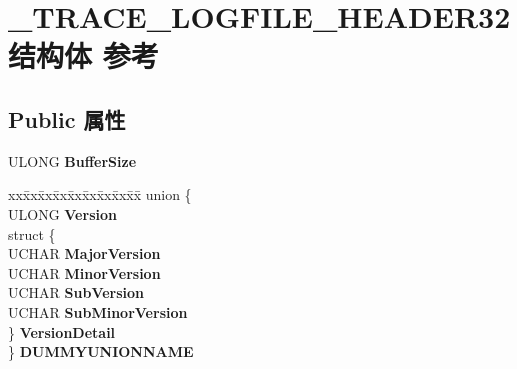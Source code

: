 \hypertarget{struct___t_r_a_c_e___l_o_g_f_i_l_e___h_e_a_d_e_r32}{}\section{\+\_\+\+T\+R\+A\+C\+E\+\_\+\+L\+O\+G\+F\+I\+L\+E\+\_\+\+H\+E\+A\+D\+E\+R32结构体 参考}
\label{struct___t_r_a_c_e___l_o_g_f_i_l_e___h_e_a_d_e_r32}
\subsection*{Public 属性}
\begin{DoxyCompactItemize}
\item 
\mbox{\label{struct___t_r_a_c_e___l_o_g_f_i_l_e___h_e_a_d_e_r32_a2806f760ee268343e968a0c167bb4b63}} 
U\+L\+O\+NG {\bfseries Buffer\+Size}
\item 
\mbox{\label{struct___t_r_a_c_e___l_o_g_f_i_l_e___h_e_a_d_e_r32_ad165bc85c23980893838d07e1df166bd}} 
\begin{tabbing}
xx\=xx\=xx\=xx\=xx\=xx\=xx\=xx\=xx\=\kill
union \{\\
\>ULONG {\bfseries Version}\\
\>struct \{\\
\>\>UCHAR {\bfseries MajorVersion}\\
\>\>UCHAR {\bfseries MinorVersion}\\
\>\>UCHAR {\bfseries SubVersion}\\
\>\>UCHAR {\bfseries SubMinorVersion}\\
\>\} {\bfseries VersionDetail}\\
\} {\bfseries DUMMYUNIONNAME}\\


\end{tabbing}
\end{DoxyCompactItemize}
